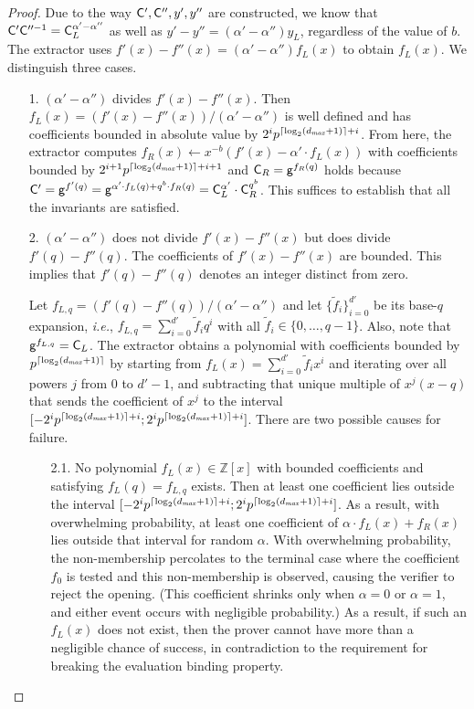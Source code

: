 \documentclass{article}
\theoremstyle{definition}
\begin{document}
\begin{proof}
Due to the way $\mathsf{C}', \mathsf{C}'', y', y''$ are constructed, we know that $\mathsf{C}'\mathsf{C}''^{-1} = \mathsf{C}_L^{\alpha' - \alpha''}$ as well as $y'-y'' = (\alpha' - \alpha'')y_L$, regardless of the value of $b$. The extractor uses $f'(x)-f''(x) = (\alpha' - \alpha'')f_L(x)$ to obtain $f_L(x)$. We distinguish three cases.
\begin{itemize}
    \itemsep0pt
    \item[1.] $(\alpha' - \alpha'')$ divides $f'(x) - f''(x)$. Then $f_L(x) = (f'(x) - f''(x)) / (\alpha' - \alpha'')$ is well defined and has coefficients bounded in absolute value by $2^ip^{\lceil \log_2(d_{\it max} + 1) \rceil+i}$. From here, the extractor computes $f_R(x) \leftarrow x^{-b}( f'(x) - \alpha' \cdot f_L(x) )$ with coefficients bounded by $2^{i+1}p^{\lceil \log_2(d_{\it max} + 1) \rceil+i+1}$ and $\mathsf{C}_R = \mathsf{g}^{f_R(q)}$ holds because $\mathsf{C}' = \mathsf{g}^{f'(q)} = \mathsf{g}^{\alpha' \cdot f_L(q) + q^b \cdot f_R(q)} = \mathsf{C}_L^{\alpha'} \cdot \mathsf{C}_R^{q^b}$. This suffices to establish that all the invariants are satisfied.
    \item[2.] $(\alpha' - \alpha'')$ does not divide $f'(x) - f''(x)$ but does divide $f'(q) - f''(q)$. The coefficients of $f'(x) - f''(x)$ are bounded. This implies that $f'(q) - f''(q)$ denotes an integer distinct from zero.
    \item[] Let $f_{L,q} = (f'(q) - f''(q))/(\alpha' - \alpha'')$ and let $\{\tilde{f}_i\}_{i=0}^{d'}$ be its base-$q$ expansion, \emph{i.e.}, $f_{L,q} = \sum_{i=0}^{d'} \tilde{f}_i q^i$ with all $\tilde{f}_i \in \{0,\ldots,q-1\}$. Also, note that $\mathsf{g}^{f_{L,q}} = \mathsf{C}_L$. The extractor obtains a polynomial with coefficients bounded by $p^{\lceil \log_2(d_{\it max} + 1) \rceil}$ by starting from $f_L(x) = \sum_{i=0}^{d'} \tilde{f}_i x^i$ and iterating over all powers $j$ from 0 to $d'-1$, and subtracting that unique multiple of $x^{j}(x-q)$ that sends the coefficient of $x^j$ to the interval $[-2^ip^{\lceil \log_2(d_{\it max} + 1) \rceil+i};2^ip^{\lceil \log_2(d_{\it max} + 1) \rceil+i}]$. There are two possible causes for failure.
    \begin{itemize}
        \item[2.1.] No polynomial $f_L(x) \in \mathbb{Z}[x]$ with bounded coefficients and satisfying $f_L(q) = f_{L,q}$ exists. Then at least one coefficient lies outside the interval $[-2^ip^{\lceil \log_2(d_{\it max} + 1) \rceil+i};2^ip^{\lceil \log_2(d_{\it max} + 1) \rceil+i}]$. As a result, with overwhelming probability, at least one coefficient of $\alpha \cdot f_L(x) + f_R(x)$ lies outside that interval for random $\alpha$. With overwhelming probability, the non-membership percolates to the terminal case where the coefficient $f_0$ is tested and this non-membership is observed, causing the verifier to reject the opening. (This coefficient shrinks only when $\alpha=0$ or $\alpha=1$, and either event occurs with negligible probability.) As a result, if such an $f_L(x)$ does not exist, then the prover cannot have more than a negligible chance of success, in contradiction to the requirement for breaking the evaluation binding property.

\end{itemize}
\end{itemize}
\end{proof}
\end{document}
